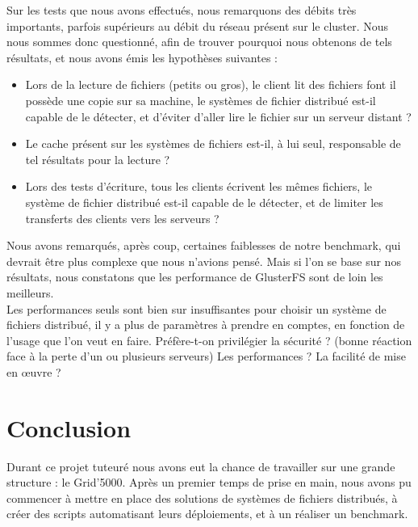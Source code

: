 \documentclass[12pt]{report}
\begin{document}
			Sur les tests que nous avons effectués, nous remarquons des débits très importants, parfois supérieurs au débit du réseau présent sur le cluster.
			Nous nous sommes donc questionné, afin de trouver pourquoi nous obtenons de tels résultats, et nous avons émis les hypothèses suivantes :
			\begin{itemize}
				\item Lors de la lecture de fichiers (petits ou gros), le client lit des fichiers font il possède une copie sur sa machine,
				le systèmes de fichier distribué est-il capable de le détecter, et d'éviter d'aller lire le fichier sur un serveur distant ?
				\item Le cache présent sur les systèmes de fichiers est-il, à lui seul, responsable de tel résultats pour la lecture ?
				\item Lors des tests d'écriture, tous les clients écrivent les mêmes fichiers, le système de fichier distribué est-il capable de le détecter,
				et de limiter les transferts des clients vers les serveurs ?\\
			\end{itemize}

			Nous avons remarqués, après coup, certaines faiblesses de notre benchmark, qui devrait être plus complexe que nous n'avions pensé.
			Mais si l'on se base sur nos résultats, nous constatons que les performance de GlusterFS sont de loin les meilleurs.\\

			Les performances seuls sont bien sur insuffisantes pour choisir un système de fichiers distribué, il y a plus de paramètres à prendre en comptes,
			en fonction de l'usage que l'on veut en faire. Préfère-t-on privilégier la sécurité ? (bonne réaction face à la perte d'un ou plusieurs serveurs)
			Les performances ? La facilité de mise en œuvre ?

	\chapter{Conclusion}

	Durant ce projet tuteuré nous avons eut la chance de travailler sur une grande structure : le Grid'5000.
	Après un premier temps de prise en main, nous avons pu commencer à mettre en place des solutions de systèmes de fichiers distribués,
	à créer des scripts automatisant leurs déploiements, et à un réaliser un benchmark.\\
\end{document}
